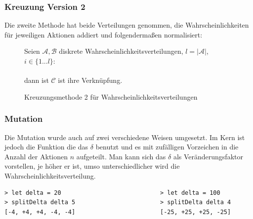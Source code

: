             \subsubsection*{Kreuzung Version 2}
            Die zweite Methode hat beide Verteilungen genommen, die Wahrscheinlichkeiten für jeweiligen Aktionen addiert und folgendermaßen normalisiert:\\
            \noindent
            \begin{figure}[H]
                \begin{mdframed}
                    Seien $\mathcal{A, B}$ diskrete Wahrscheinlichkeitsverteilungen, $l = |\mathcal{A}|$, $i \in \{1 ... l\}$:\\[4mm]
                    \hspace*{40mm} \\[4mm]
                    dann ist $\mathcal{C}$ ist ihre Verknüpfung.
                \end{mdframed}
                \renewcommand{\figurename}{Definition}
                \caption{\label{norm-prop} Kreuzungsmethode 2 für Wahrscheinlichkeitsverteilungen}
            \end{figure}

            \subsubsection*{Mutation}
            Die Mutation wurde auch auf zwei verschiedene Weisen umgesetzt. Im Kern ist jedoch die Funktion die das $\delta$ benutzt und es mit zufälligen Vorzeichen in die Anzahl der Aktionen $n$ aufgeteilt. Man kann sich das $\delta$ als Veränderungsfaktor vorstellen, je höher er ist, umso unterschiedlicher wird die Wahrscheinlichkeitsverteilung.
            \begin{mdframed}
                \begin{verbatim}
> let delta = 20                            > let delta = 100
> splitDelta delta 5                        > splitDelta delta 4
[-4, +4, +4, -4, -4]                        [-25, +25, +25, -25]
                \end{verbatim}
            \end{mdframed}

